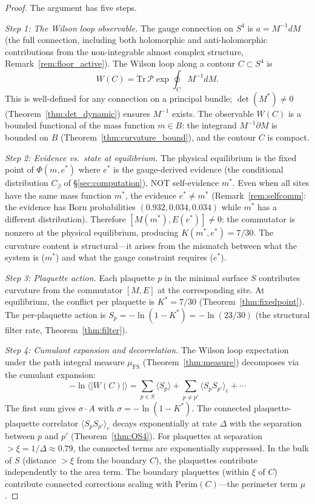 \documentclass[11pt,a4paper]{article}
\theoremstyle{definition}
\theoremstyle{remark}
\newcommand{\Tr}{\mathrm{Tr}}
\begin{document}
\begin{proof}
The argument has five steps.

\emph{Step 1: The Wilson loop observable.} The gauge connection on $S^4$ is $a=M^{-1}dM$ (the full connection, including both holomorphic and anti-holomorphic contributions from the non-integrable almost complex structure, Remark~\ref{rem:floor_active}). The Wilson loop along a contour $C\subset S^4$ is
\[
W(C)=\Tr\,\mathcal{P}\exp\!\oint_C M^{-1}dM.
\]
This is well-defined for any connection on a principal bundle; $\det(M^*)\neq 0$ (Theorem~\ref{thm:det_dynamic}) ensures $M^{-1}$ exists. The observable $W(C)$ is a bounded functional of the mass function $m\in B$: the integrand $M^{-1}\partial M$ is bounded on $B$ (Theorem~\ref{thm:curvature_bound}), and the contour $C$ is compact.

\emph{Step 2: Evidence vs.\ state at equilibrium.} The physical equilibrium is the fixed point of $\Phi(m,e^*)$ where $e^*$ is the gauge-derived evidence (the conditional distribution $C_\beta$ of \S\ref{sec:computation}), NOT self-evidence $m^*$. Even when all sites have the same mass function $m^*$, the evidence $e^*\neq m^*$ (Remark~\ref{rem:selfcomm}: the evidence has Born probabilities $(0.932,0.034,0.034)$ while $m^*$ has a different distribution). Therefore $[M(m^*),E(e^*)]\neq 0$: the commutator is nonzero at the physical equilibrium, producing $K(m^*,e^*)=7/30$. The curvature content is structural---it arises from the mismatch between what the system is ($m^*$) and what the gauge constraint requires ($e^*$).

\emph{Step 3: Plaquette action.} Each plaquette $p$ in the minimal surface $S$ contributes curvature from the commutator $[M,E]$ at the corresponding site. At equilibrium, the conflict per plaquette is $K^*=7/30$ (Theorem~\ref{thm:fixedpoint}). The per-plaquette action is $S_p=-\ln(1-K^*)=-\ln(23/30)$ (the structural filter rate, Theorem~\ref{thm:filter}).

\emph{Step 4: Cumulant expansion and decorrelation.} The Wilson loop expectation under the path integral measure $\mu_{\mathrm{FS}}$ (Theorem~\ref{thm:measure}) decomposes via the cumulant expansion:
\[
-\ln\langle|W(C)|\rangle=\sum_{p\in S}\langle S_p\rangle+\sum_{p\neq p'}\langle S_p S_{p'}\rangle_c+\cdots
\]
The first sum gives $\sigma\cdot A$ with $\sigma=-\ln(1-K^*)$. The connected plaquette-plaquette correlator $\langle S_p S_{p'}\rangle_c$ decays exponentially at rate $\Delta$ with the separation between $p$ and $p'$ (Theorem~\ref{thm:OS4}). For plaquettes at separation $>\xi=1/\Delta\approx 0.79$, the connected terms are exponentially suppressed. In the bulk of $S$ (distance $>\xi$ from the boundary $C$), the plaquettes contribute independently to the area term. The boundary plaquettes (within $\xi$ of $C$) contribute connected corrections scaling with $\mathrm{Perim}(C)$---the perimeter term $\mu$.


\end{proof}
\end{document}
